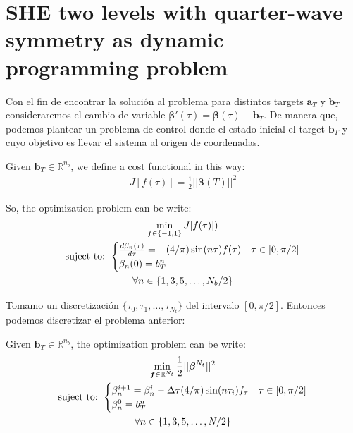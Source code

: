 \section{SHE two levels with quarter-wave symmetry as dynamic programming problem}

Con el fin de encontrar la solución al problema para distintos targets $\bm{a}_T$ y $\bm{b}_T$ consideraremos el cambio de variable $\bm{\beta}'(\tau) = \bm{\beta}(\tau) - \bm{b}_T$. De manera que, podemos plantear un problema de control donde el estado inicial el target $\bm{b}_T$ y cuyo objetivo es llevar el sistema al origen de coordenadas.
\begin{problem}
    Given  $\bm{b}_T  \in \mathbb{R}^{n_b}$, we define a cost functional in this way: 
        \begin{gather}
        J[f(\tau)] =  \frac{1}{2}|| \bm{\beta}(T)||^2  
    \end{gather}


    So, the optimization problem can be write: 
    \begin{gather}
        \min_{f \in \{-1,1\} } J[f(\tau)]) \\
        \text{suject to: }
        \begin{cases}
            \frac{d\beta_n(\tau)}{d\tau} =  - (4/\pi) \sin(n\tau) f(\tau) & \tau \in [0,\pi/2]\label{dyn}\\
            \beta_n(0) = b_T^n
        \end{cases} \\
        \notag \forall n \in \{1,3,5,\dots,N_b/2 \}
    \end{gather}
    
\end{problem}

Tomamo un discretización $\{\tau_0,\tau_1,\dots,\tau_{N_t} \}$ del intervalo $[0,\pi/2]$. Entonces podemos discretizar el problema anterior:

\begin{problem}
    Given  $\bm{b}_T  \in \mathbb{R}^{n_b}$,  the optimization problem can be write: 
    \begin{gather}
        \min_{\bm{f} \in \mathbb{R}^{N_t} } \frac{1}{2}||\bm{\beta}^{N_t}||^2 \\
        \text{suject to: }
        \begin{cases}
            \beta_n^{i+1} = \beta_n^{i} - \Delta \tau (4/\pi) \sin(n\tau_i) f_\tau & \tau \in [0,\pi/2]\label{dyn}\\
            \beta_n^0 = b_T^n
        \end{cases} \\
        \notag \forall n \in \{1,3,5,\dots,N/2 \}
    \end{gather}

\end{problem}

